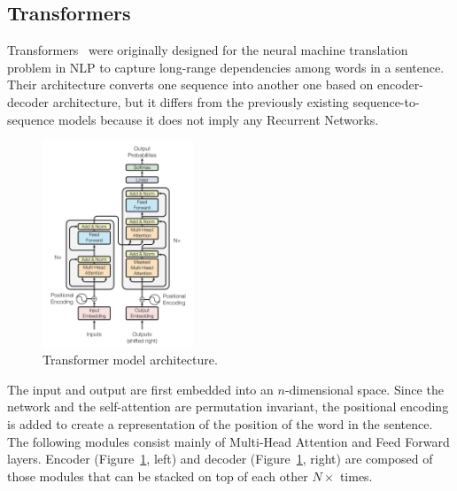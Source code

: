 \subsection{Transformers}
\label{trans}
Transformers~\cite{vaswani2017attention} were originally designed for the neural machine translation
problem in NLP to capture long-range dependencies among words in a sentence.
Their architecture converts one sequence into another one based on encoder-decoder architecture,
but it differs from the previously existing sequence-to-sequence models because
it does not imply any Recurrent Networks. 
\begin{figure}
  \centering
  \includegraphics[width=0.4\textwidth]{figures/03_transformer_overview.png}
  \caption{Transformer model architecture. \cite{vaswani2017attention}}
  \label{fig:trans_arch}
\end{figure}
The input and output are first embedded into an $n$-dimensional space.
Since the network and the self-attention are permutation invariant,
the positional encoding is added to create a representation of the position of the word in the sentence.
The following modules consist mainly of Multi-Head Attention and Feed Forward layers. 
Encoder (Figure~\ref{fig:trans_arch}, left) and decoder (Figure~\ref{fig:trans_arch}, right)
are composed of those modules that can be stacked on top of each other $N\times$ times.

